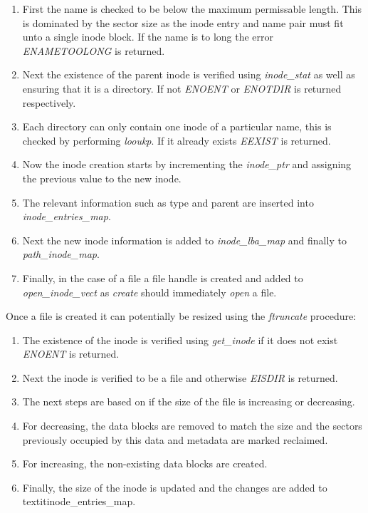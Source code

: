 \begin{enumerate}
    \item First the name is checked to be below the maximum permissable length.
    This is dominated by the sector size as the inode entry and name pair must
    fit unto a single inode block. If the name is to long the error
    \textit{ENAMETOOLONG} is returned.
    \item Next the existence of the parent inode is verified using 
    \textit{inode\_stat} as well as ensuring that it is a directory.
    If not \textit{ENOENT} or \textit{ENOTDIR} is returned respectively.
    \item Each directory can only contain one inode of a particular name, this
    is checked by performing \textit{looukp}. If it already exists
    \textit{EEXIST} is returned.
    \item Now the inode creation starts by incrementing the \textit{inode\_ptr}
    and assigning the previous value to the new inode.
    \item The relevant information such as type and parent are inserted into
    \textit{inode\_entries\_map}.
    \item Next the new inode information is added to \textit{inode\_lba\_map}
    and finally to \textit{path\_inode\_map}.
    \item Finally, in the case of a file a file handle is created and 
    added to \textit{open\_inode\_vect} as \textit{create} should immediately
    \textit{open} a file.
\end{enumerate}

Once a file is created it can potentially be resized using the
\textit{ftruncate} procedure:

\begin{enumerate}
    \item The existence of the inode is verified using \textit{get\_inode} if
    it does not exist \textit{ENOENT} is returned.
    \item Next the inode is verified to be a file and otherwise \textit{EISDIR}
    is returned.
    \item The next steps are based on if the size of the file is increasing or
    decreasing.
    \item For decreasing, the data blocks are removed to match the size and the
    sectors previously occupied by this data and metadata are marked reclaimed.
    \item For increasing, the non-existing data blocks are created.
    \item Finally, the size of the inode is updated and the changes are added
    to textit{inode\_entries\_map}.
\end{enumerate}


